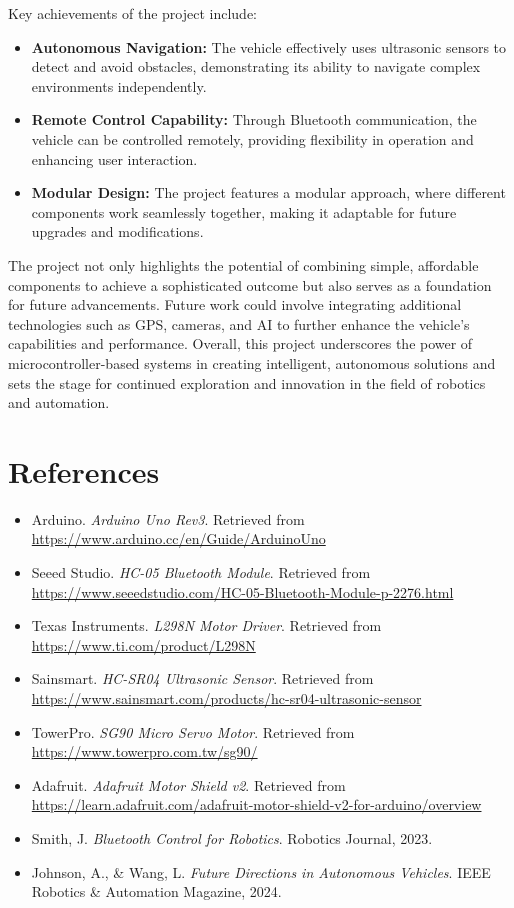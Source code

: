 \documentclass[12pt,a4paper]{report}
\begin{document}
Key achievements of the project include:
\begin{itemize}
    \item \textbf{Autonomous Navigation:} The vehicle effectively uses ultrasonic sensors to detect and avoid obstacles, demonstrating its ability to navigate complex environments independently.
    \item \textbf{Remote Control Capability:} Through Bluetooth communication, the vehicle can be controlled remotely, providing flexibility in operation and enhancing user interaction.
    \item \textbf{Modular Design:} The project features a modular approach, where different components work seamlessly together, making it adaptable for future upgrades and modifications.
\end{itemize}

The project not only highlights the potential of combining simple, affordable components to achieve a sophisticated outcome but also serves as a foundation for future advancements. Future work could involve integrating additional technologies such as GPS, cameras, and AI to further enhance the vehicle's capabilities and performance. Overall, this project underscores the power of microcontroller-based systems in creating intelligent, autonomous solutions and sets the stage for continued exploration and innovation in the field of robotics and automation.

\chapter*{References}

\begin{itemize}
    \item Arduino. \textit{Arduino Uno Rev3}. Retrieved from \url{https://www.arduino.cc/en/Guide/ArduinoUno}
    \item Seeed Studio. \textit{HC-05 Bluetooth Module}. Retrieved from \url{https://www.seeedstudio.com/HC-05-Bluetooth-Module-p-2276.html}
    \item Texas Instruments. \textit{L298N Motor Driver}. Retrieved from \url{https://www.ti.com/product/L298N}
    \item Sainsmart. \textit{HC-SR04 Ultrasonic Sensor}. Retrieved from \url{https://www.sainsmart.com/products/hc-sr04-ultrasonic-sensor}
    \item TowerPro. \textit{SG90 Micro Servo Motor}. Retrieved from \url{https://www.towerpro.com.tw/sg90/}
    \item Adafruit. \textit{Adafruit Motor Shield v2}. Retrieved from \url{https://learn.adafruit.com/adafruit-motor-shield-v2-for-arduino/overview}
    \item Smith, J. \textit{Bluetooth Control for Robotics}. Robotics Journal, 2023.
    \item Johnson, A., \& Wang, L. \textit{Future Directions in Autonomous Vehicles}. IEEE Robotics \& Automation Magazine, 2024.
\end{itemize}
\end{document}
